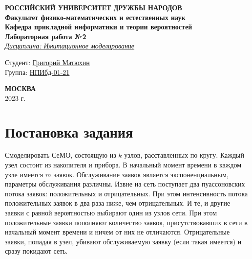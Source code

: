\documentclass[12pt]{article}
\begin{document}
\begin{titlepage}

	\begin{center}
		\hfill \break
		\textbf{
			\large{РОССИЙСКИЙ УНИВЕРСИТЕТ ДРУЖБЫ НАРОДОВ}\\
			\normalsize{Факультет физико-математических и естественных наук}\\
			\normalsize{Кафедра прикладной информатики и теории вероятностей}\\
		}
		\vspace*{\fill}
		\Large{\textbf{Лабораторная работа №2}}
		\\
		\underline{\textit{\normalsize{Дисциплина: Имитационное моделирование}}}
		\vspace*{\fill}

	\end{center}

	\begin{flushright}
		Студент: \underline{Григорий Матюхин}\\ \vspace{0.5cm}
		Группа: \underline{НПИбд-01-21}
	\end{flushright}


	\begin{center} \textbf{МОСКВА} \\ 2023 г. \end{center}
	\thispagestyle{empty} %

\end{titlepage}
\newpage
\tableofcontents
\newpage

\section{Постановка задания}
Смоделировать СеМО, состоящую из $k$ узлов, расставленных по кругу.
Каждый узел состоит из накопителя и прибора.
В начальный момент времени в каждом узле имеется $m$ заявок.
Обслуживание заявок является экспоненциальным, параметры обслуживания различны.
Извне на сеть поступает два пуассоновских потока заявок: положительных и отрицательных.
При этом интенсивность потока положительных заявок в два раза ниже, чем отрицательных.
И те, и другие заявки с равной вероятностью выбирают один из узлов сети.
При этом положительные заявки пополняют количество заявок,
присутствовавших в сети в начальный момент времени и ничем от них не отличаются.
Отрицательные заявки, попадая в узел,
убивают обслуживаемую заявку (если такая имеется) и сразу покидают сеть.
\end{document}
